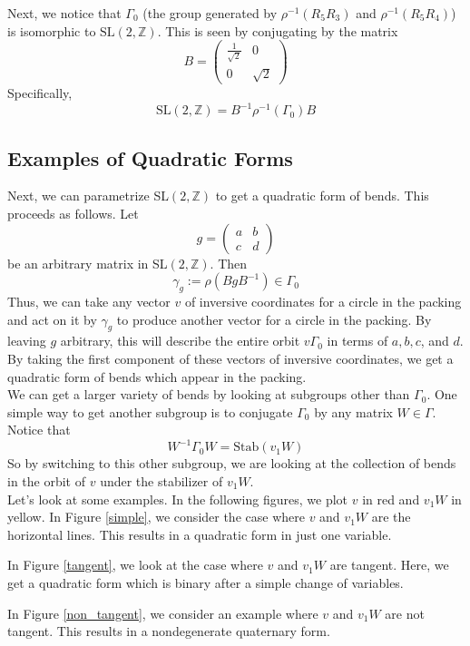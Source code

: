 \documentclass[]{article}
\begin{document}
Next, we notice that $\Gamma_0$ (the group generated by $\rho^{-1}(R_5R_3)$ and $\rho^{-1}(R_5R_4)$) is isomorphic to $\text{SL}(2, \mathbb{Z})$.
This is seen by conjugating by the matrix
$$
B =
\begin{pmatrix}
\frac{1}{\sqrt{2}} & 0 \\
0 & \sqrt{2}
\end{pmatrix}
$$
Specifically,
$$
\text{SL}(2, \mathbb{Z}) =
B^{-1}\rho^{-1}(\Gamma_0)B
$$

\subsection*{Examples of Quadratic Forms}

Next, we can parametrize SL$(2, \mathbb{Z})$ to get a quadratic form of bends.
This proceeds as follows.
Let
$$
g =
\begin{pmatrix}
a & b \\
c & d
\end{pmatrix}
$$
be an arbitrary matrix in SL$(2, \mathbb{Z})$.
Then
$$
\gamma_g := \rho\left( BgB^{-1} \right) \in \Gamma_0
$$
Thus, we can take any vector $v$ of inversive coordinates for a circle in the packing and act on it by $\gamma_g$ to produce another vector for a circle in the packing.
By leaving $g$ arbitrary, this will describe the entire orbit $v\Gamma_0$ in terms of $a, b, c$, and $d$.
By taking the first component of these vectors of inversive coordinates, we get a quadratic form of bends which appear in the packing.
\\

We can get a larger variety of bends by looking at subgroups other than $\Gamma_0$.
One simple way to get another subgroup is to conjugate $\Gamma_0$ by any matrix $W \in \Gamma$.
Notice that
$$
W^{-1}\Gamma_0W = \text{Stab}(v_1W)
$$
So by switching to this other subgroup, we are looking at the collection of bends in the orbit of $v$ under the stabilizer of $v_1W$.
\\

Let's look at some examples.
In the following figures, we plot $v$ in red and $v_1W$ in yellow.
In Figure \ref{simple}, we consider the case where $v$ and $v_1W$ are the horizontal lines.
This results in a quadratic form in just one variable.

In Figure \ref{tangent}, we look at the case where $v$ and $v_1W$ are tangent.
Here, we get a quadratic form which is binary after a simple change of variables.

In Figure \ref{non_tangent}, we consider an example where $v$ and $v_1W$ are not tangent.
This results in a nondegenerate quaternary form.
\end{document}
